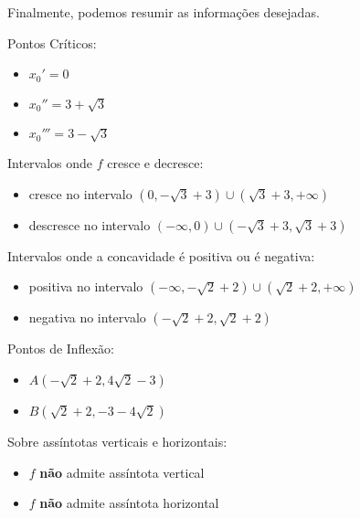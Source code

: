 \documentclass{article}
\begin{document}
Finalmente, podemos resumir as informações desejadas.


Pontos Críticos:
\begin{itemize}
    \item \(x_0' = 0\)
    \item \(x_0'' = 3 + \sqrt{3}\)
    \item \(x_0''' = 3 - \sqrt{3}\)
\end{itemize}

Intervalos onde \(f\) cresce e decresce:
\begin{itemize}
    \item cresce no intervalo \(  (0, -\sqrt{3} + 3) \cup (\sqrt{3} + 3, +\infty)  \)
    \item descresce no intervalo \(  (-\infty, 0) \cup (-\sqrt{3} + 3, \sqrt{3} + 3)   \)
\end{itemize}

Intervalos onde a concavidade é positiva ou é negativa:
\begin{itemize}
    \item positiva no intervalo \(  (-\infty, -\sqrt{2} + 2) \cup (\sqrt{2} + 2, +\infty)  \)
    \item negativa no intervalo \(  (-\sqrt{2} + 2, \sqrt{2} + 2)   \)
\end{itemize}

Pontos de Inflexão:
\begin{itemize}
    \item \( A(-\sqrt{2} + 2, 4\sqrt{2} - 3)\)
    \item \( B(\sqrt{2} + 2, -3-4\sqrt{2}) \)
\end{itemize}

Sobre assíntotas verticais e horizontais:
\begin{itemize}
    \item \(f\) \textbf{não} admite assíntota vertical
    \item \(f\) \textbf{não} admite assíntota horizontal
\end{itemize}
\end{document}
